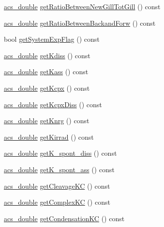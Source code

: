 \begin{DoxyCompactItemize}
\hyperlink{a00050_ab776853a005fcbf56af0424a2a4dd607}{acs\+\_\+double} \hyperlink{a00013_a98a4989029d77e99cf2ca9fb0eb1c2ab}{get\+Ratio\+Between\+New\+Gill\+Tot\+Gill} () const 
\item 
\hyperlink{a00050_ab776853a005fcbf56af0424a2a4dd607}{acs\+\_\+double} \hyperlink{a00013_aa0e7940868932ac4b26fd61943952528}{get\+Ratio\+Between\+Backand\+Forw} () const 
\item 
bool \hyperlink{a00013_a883327bbb969164eb8b3c2d1c941ca03}{get\+System\+Exp\+Flag} () const 
\item 
\hyperlink{a00050_ab776853a005fcbf56af0424a2a4dd607}{acs\+\_\+double} \hyperlink{a00013_ab429d2057ee1092bf210c29e70153f75}{get\+Kdiss} () const 
\item 
\hyperlink{a00050_ab776853a005fcbf56af0424a2a4dd607}{acs\+\_\+double} \hyperlink{a00013_aa862f1f98c6060747d6f1f30377671ff}{get\+Kass} () const 
\item 
\hyperlink{a00050_ab776853a005fcbf56af0424a2a4dd607}{acs\+\_\+double} \hyperlink{a00013_ac62c6b719db59d5829e3cc451b237f44}{get\+Kcpx} () const 
\item 
\hyperlink{a00050_ab776853a005fcbf56af0424a2a4dd607}{acs\+\_\+double} \hyperlink{a00013_a9091c4a0fe31f6d5f5330e7ebff297a3}{get\+Kcpx\+Diss} () const 
\item 
\hyperlink{a00050_ab776853a005fcbf56af0424a2a4dd607}{acs\+\_\+double} \hyperlink{a00013_a7615c746521a592ff1ab2d0793b14d89}{get\+Knrg} () const 
\item 
\hyperlink{a00050_ab776853a005fcbf56af0424a2a4dd607}{acs\+\_\+double} \hyperlink{a00013_a4c163b36e84cd8406aff4ab5d220a251}{get\+Kirrad} () const 
\item 
\hyperlink{a00050_ab776853a005fcbf56af0424a2a4dd607}{acs\+\_\+double} \hyperlink{a00013_a2c6ca24592b5feab891e43233c581711}{get\+K\+\_\+spont\+\_\+diss} () const 
\item 
\hyperlink{a00050_ab776853a005fcbf56af0424a2a4dd607}{acs\+\_\+double} \hyperlink{a00013_a6557765370b636bc7d4e02288b444c0e}{get\+K\+\_\+spont\+\_\+ass} () const 
\item 
\hyperlink{a00050_ab776853a005fcbf56af0424a2a4dd607}{acs\+\_\+double} \hyperlink{a00013_a771963196a27d3532cd7af4b98a5a9c5}{get\+Cleavage\+K\+C} () const 
\item 
\hyperlink{a00050_ab776853a005fcbf56af0424a2a4dd607}{acs\+\_\+double} \hyperlink{a00013_abf3168adf05ff9fa6bab4e34b387f0a6}{get\+Complex\+K\+C} () const 
\item 
\hyperlink{a00050_ab776853a005fcbf56af0424a2a4dd607}{acs\+\_\+double} \hyperlink{a00013_a7ac1b69dd38107d5c40339563969d09f}{get\+Condensation\+K\+C} () const 

\end{DoxyCompactItemize}
